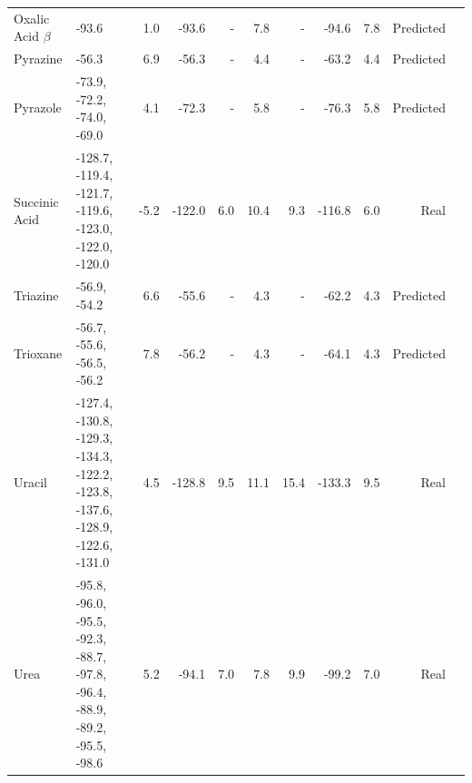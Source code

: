\begin{longtable}{lp{35mm}rrrrrrrrr}
Oxalic Acid $\beta$ & -93.6 & 1.0 & -93.6 & - & 7.8 & - & -94.6 & 7.8 & Predicted \\
Pyrazine & -56.3 & 6.9 & -56.3 & - & 4.4 & - & -63.2 & 4.4 & Predicted \\
Pyrazole & -73.9, -72.2, -74.0, -69.0 & 4.1 & -72.3 & - & 5.8 & - & -76.3 & 5.8 & Predicted \\
Succinic Acid & -128.7, -119.4, -121.7, -119.6, -123.0, -122.0, -120.0 & -5.2 & -122.0 & 6.0 & 10.4 & 9.3 & -116.8 & 6.0 & Real \\
Triazine & -56.9, -54.2 & 6.6 & -55.6 & - & 4.3 & - & -62.2 & 4.3 & Predicted \\
Trioxane & -56.7, -55.6, -56.5, -56.2 & 7.8 & -56.2 & - & 4.3 & - & -64.1 & 4.3 & Predicted \\
Uracil & -127.4, -130.8, -129.3, -134.3, -122.2, -123.8, -137.6, -128.9, -122.6, -131.0 & 4.5 & -128.8 & 9.5 & 11.1 & 15.4 & -133.3 & 9.5 & Real \\
Urea & -95.8, -96.0, -95.5, -92.3, -88.7, -97.8, -96.4, -88.9, -89.2, -95.5, -98.6 & 5.2 & -94.1 & 7.0 & 7.8 & 9.9 & -99.2 & 7.0 & Real \\
\end{longtable}